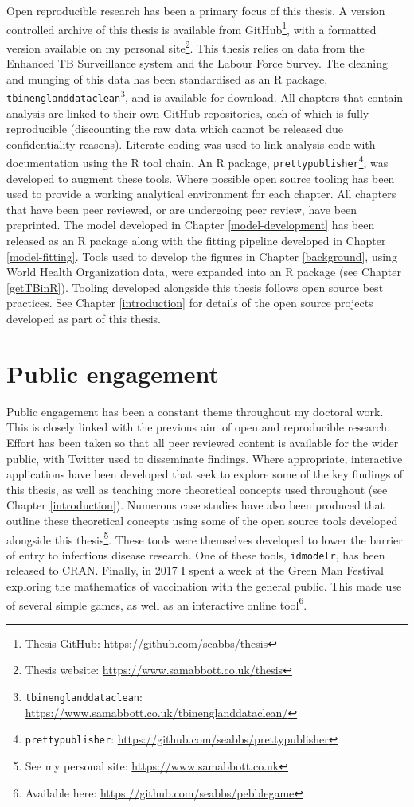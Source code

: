 \documentclass[11pt,twoside]{bristolthesis}
\begin{document}
  Open reproducible research has been a primary focus of this thesis. A version controlled archive of this thesis is available from GitHub\footnote{Thesis GitHub: \url{https://github.com/seabbs/thesis}}, with a formatted version available on my personal site\footnote{Thesis website: \url{https://www.samabbott.co.uk/thesis}}. This thesis relies on data from the Enhanced TB Surveillance system and the Labour Force Survey. The cleaning and munging of this data has been standardised as an R package, \texttt{tbinenglanddataclean}\footnote{\texttt{tbinenglanddataclean}: \url{https://www.samabbott.co.uk/tbinenglanddataclean/}}, and is available for download. All chapters that contain analysis are linked to their own GitHub repositories, each of which is fully reproducible (discounting the raw data which cannot be released due confidentiality reasons). Literate coding was used to link analysis code with documentation using the R tool chain. An R package, \texttt{prettypublisher}\footnote{\texttt{prettypublisher}: \url{https://github.com/seabbs/prettypublisher}}, was developed to augment these tools. Where possible open source tooling has been used to provide a working analytical environment for each chapter. All chapters that have been peer reviewed, or are undergoing peer review, have been preprinted. The model developed in Chapter \ref{model-development} has been released as an R package along with the fitting pipeline developed in Chapter \ref{model-fitting}. Tools used to develop the figures in Chapter \ref{background}, using World Health Organization data, were expanded into an R package (see Chapter \ref{getTBinR}). Tooling developed alongside this thesis follows open source best practices. See Chapter \ref{introduction} for details of the open source projects developed as part of this thesis.
  
  \hypertarget{public-engagement}{%
  \section{Public engagement}\label{public-engagement}}
  
  Public engagement has been a constant theme throughout my doctoral work. This is closely linked with the previous aim of open and reproducible research. Effort has been taken so that all peer reviewed content is available for the wider public, with Twitter used to disseminate findings. Where appropriate, interactive applications have been developed that seek to explore some of the key findings of this thesis, as well as teaching more theoretical concepts used throughout (see Chapter \ref{introduction}). Numerous case studies have also been produced that outline these theoretical concepts using some of the open source tools developed alongside this thesis\footnote{See my personal site: \url{https://www.samabbott.co.uk}}. These tools were themselves developed to lower the barrier of entry to infectious disease research. One of these tools, \texttt{idmodelr}, has been released to CRAN. Finally, in 2017 I spent a week at the Green Man Festival exploring the mathematics of vaccination with the general public. This made use of several simple games, as well as an interactive online tool\footnote{Available here: \url{https://github.com/seabbs/pebblegame}}.
  
\end{document}

